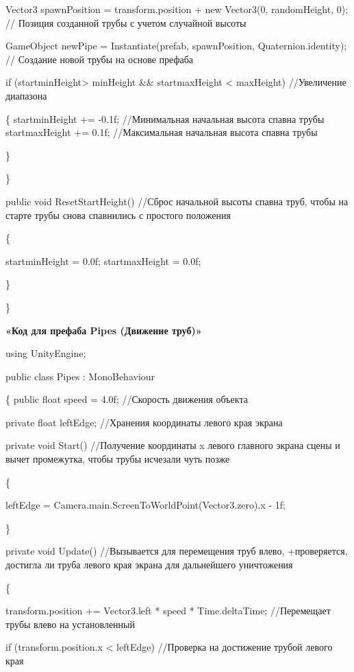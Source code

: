 \documentclass[14pt, oneside]{altsu-report}
\begin{document}
        Vector3 spawnPosition = transform.position + new Vector3(0, randomHeight, 0); // Позиция созданной трубы с учетом случайной высоты

        GameObject newPipe = Instantiate(prefab, spawnPosition, Quaternion.identity); // Создание новой трубы на основе префаба

        if (startminHeight> minHeight \&\& startmaxHeight < maxHeight) //Увеличение диапазона

        \{
            startminHeight += -0.1f; //Минимальная начальная высота спавна трубы
            startmaxHeight += 0.1f; //Максимальная начальная высота спавна трубы

        \}
        
    \}

    public void ResetStartHeight() //Сброс начальной высоты спавна труб, чтобы на старте трубы снова спавнились с простого положения
    
    \{
    
        startminHeight = 0.0f;
        startmaxHeight = 0.0f;
        
    \}

\}


\begin{center}
\label{code:appendix}\textbf{«Код для префаба Pipes (Движение труб)»} 
\end{center}

using UnityEngine;

public class Pipes : MonoBehaviour

\{
    public float speed = 4.0f; //Скорость движения объекта

    private float leftEdge; //Хранения координаты левого края экрана

    private void Start() //Получение координаты x левого главного экрана сцены и вычет промежутка, чтобы трубы исчезали чуть позже 
    
    \{
    
        leftEdge = Camera.main.ScreenToWorldPoint(Vector3.zero).x - 1f;
        
    \}

    private void Update() //Вызывается для перемещения труб влево, +проверяется, достигла ли труба левого края экрана для дальнейшего уничтожения

    \{
    
        transform.position += Vector3.left * speed * Time.deltaTime; //Перемещает трубы влево на установленный 

        if (transform.position.x < leftEdge) //Проверка на достижение трубой левого края
        
\end{document}
